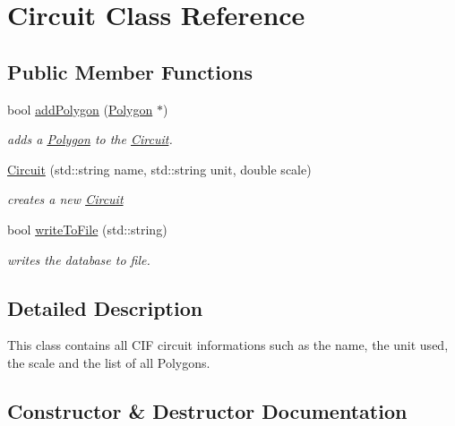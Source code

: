 \hypertarget{class_c_i_f_1_1_circuit}{}\section{Circuit Class Reference}
\label{class_c_i_f_1_1_circuit}
\subsection*{Public Member Functions}
\begin{DoxyCompactItemize}
\item 
bool \hyperlink{class_c_i_f_1_1_circuit_a5b37e86206e2a128ba6db4987dc09a39}{add\+Polygon} (\hyperlink{class_c_i_f_1_1_polygon}{Polygon} $\ast$)
\begin{DoxyCompactList}\small\item\em adds a \hyperlink{class_c_i_f_1_1_polygon}{Polygon} to the \hyperlink{class_c_i_f_1_1_circuit}{Circuit}. \end{DoxyCompactList}\item 
\hyperlink{class_c_i_f_1_1_circuit_ad434e573e0ce37a59f39fa74fe9bfb79}{Circuit} (std\+::string name, std\+::string unit, double scale)
\begin{DoxyCompactList}\small\item\em creates a new \hyperlink{class_c_i_f_1_1_circuit}{Circuit} \end{DoxyCompactList}\item 
bool \hyperlink{class_c_i_f_1_1_circuit_a90c823b70c4984f302c19ceca604d101}{write\+To\+File} (std\+::string)
\begin{DoxyCompactList}\small\item\em writes the database to file. \end{DoxyCompactList}\end{DoxyCompactItemize}


\subsection{Detailed Description}
This class contains all C\+IF circuit informations such as the name, the unit used, the scale and the list of all Polygons. 

\subsection{Constructor \& Destructor Documentation}
\mbox{\label{class_c_i_f_1_1_circuit_ad434e573e0ce37a59f39fa74fe9bfb79}} 
